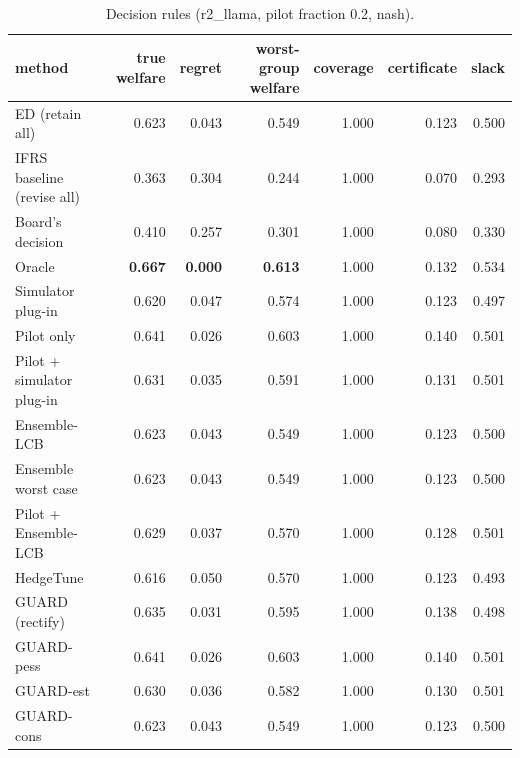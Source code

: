 \begin{table}[t]
\centering
\small
\begin{tabular}{lrrrrrr}
\toprule
method & true welfare & regret & worst-group welfare & coverage & certificate & slack \\
\midrule
ED (retain all) & 0.623 & 0.043 & 0.549 & 1.000 & 0.123 & 0.500 \\
IFRS baseline (revise all) & 0.363 & 0.304 & 0.244 & 1.000 & 0.070 & 0.293 \\
Board's decision & 0.410 & 0.257 & 0.301 & 1.000 & 0.080 & 0.330 \\
Oracle & \textbf{0.667} & \textbf{0.000} & \textbf{0.613} & 1.000 & 0.132 & 0.534 \\
Simulator plug-in & 0.620 & 0.047 & 0.574 & 1.000 & 0.123 & 0.497 \\
Pilot only & 0.641 & 0.026 & 0.603 & 1.000 & 0.140 & 0.501 \\
Pilot + simulator plug-in & 0.631 & 0.035 & 0.591 & 1.000 & 0.131 & 0.501 \\
Ensemble-LCB & 0.623 & 0.043 & 0.549 & 1.000 & 0.123 & 0.500 \\
Ensemble worst case & 0.623 & 0.043 & 0.549 & 1.000 & 0.123 & 0.500 \\
Pilot + Ensemble-LCB & 0.629 & 0.037 & 0.570 & 1.000 & 0.128 & 0.501 \\
HedgeTune & 0.616 & 0.050 & 0.570 & 1.000 & 0.123 & 0.493 \\
GUARD (rectify) & 0.635 & 0.031 & 0.595 & 1.000 & 0.138 & 0.498 \\
GUARD-pess & 0.641 & 0.026 & 0.603 & 1.000 & 0.140 & 0.501 \\
GUARD-est & 0.630 & 0.036 & 0.582 & 1.000 & 0.130 & 0.501 \\
GUARD-cons & 0.623 & 0.043 & 0.549 & 1.000 & 0.123 & 0.500 \\
\bottomrule
\end{tabular}
\caption{Decision rules (r2\_llama, pilot fraction 0.2, nash).}
\label{tab:methods-nash}
\end{table}
